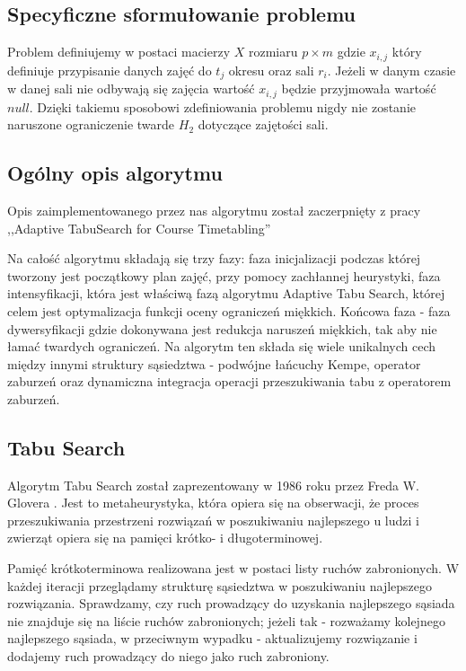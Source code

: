 \documentclass[11pt]{report}
\begin{document}
\subsection{Specyficzne sformułowanie problemu}
\par Problem definiujemy w postaci macierzy ${X}$  rozmiaru ${p \times m}$ gdzie ${x_{i,j}}$ który definiuje przypisanie danych zajęć do ${t_{j}}$ okresu oraz sali ${r_{i}}$. Jeżeli w danym czasie w danej sali nie odbywają się zajęcia wartość ${x_{i,j}}$ będzie przyjmowała wartość ${null}$. Dzięki takiemu sposobowi zdefiniowania problemu nigdy nie zostanie naruszone ograniczenie twarde ${H_{2}}$ dotyczące zajętości sali.
\subsection{Ogólny opis algorytmu}
\par Opis zaimplementowanego przez nas algorytmu został zaczerpnięty z pracy ,,Adaptive TabuSearch for Course Timetabling'' \cite{tabu}
\par Na całość algorytmu składają się trzy fazy: faza inicjalizacji podczas której tworzony jest początkowy plan zajęć, przy pomocy zachłannej heurystyki, faza intensyfikacji, która jest właściwą fazą algorytmu Adaptive Tabu Search, której celem jest optymalizacja funkcji oceny ograniczeń miękkich. Końcowa faza - faza dywersyfikacji gdzie dokonywana jest redukcja naruszeń miękkich, tak aby nie łamać twardych ograniczeń. Na algorytm ten składa się wiele unikalnych cech między innymi struktury sąsiedztwa - podwójne łańcuchy Kempe, operator zaburzeń oraz dynamiczna integracja operacji przeszukiwania tabu z operatorem zaburzeń.

\subsection{Tabu Search}
\par Algorytm Tabu Search został zaprezentowany w 1986 roku przez Freda W. Glovera \cite{glover}. Jest to metaheurystyka, która opiera się na obserwacji, że proces przeszukiwania przestrzeni rozwiązań w poszukiwaniu najlepszego u ludzi i zwierząt opiera się na pamięci krótko- i długoterminowej. 
\par Pamięć krótkoterminowa realizowana jest w postaci listy ruchów zabronionych. W każdej iteracji przeglądamy strukturę sąsiedztwa w poszukiwaniu najlepszego rozwiązania. Sprawdzamy, czy ruch prowadzący do uzyskania najlepszego sąsiada nie znajduje się na liście ruchów zabronionych; jeżeli tak - rozważamy kolejnego najlepszego sąsiada, w przeciwnym wypadku - aktualizujemy rozwiązanie i dodajemy ruch prowadzący do niego jako ruch zabroniony.
\end{document}
